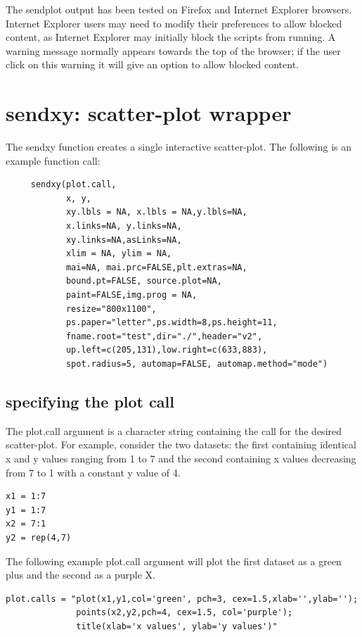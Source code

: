 \documentclass[]{article}
\begin{document}
\vskip5mm
 The sendplot output has been tested on Firefox and Internet Explorer browsers.  Internet Explorer users may need to modify their preferences to allow blocked content, as Internet Explorer may initially block the scripts from running. A warning message normally appears towards the top of the browser; if the user click on this warning it will give an option to allow blocked content.



\section{sendxy: scatter-plot wrapper}

The sendxy function creates a single interactive scatter-plot. The following is an example function call:
\begin{verbatim}
     sendxy(plot.call,
            x, y, 
            xy.lbls = NA, x.lbls = NA,y.lbls=NA,
            x.links=NA, y.links=NA,
            xy.links=NA,asLinks=NA,
            xlim = NA, ylim = NA,
            mai=NA, mai.prc=FALSE,plt.extras=NA,
            bound.pt=FALSE, source.plot=NA,
            paint=FALSE,img.prog = NA,
            resize="800x1100",
            ps.paper="letter",ps.width=8,ps.height=11,
            fname.root="test",dir="./",header="v2",
            up.left=c(205,131),low.right=c(633,883),
            spot.radius=5, automap=FALSE, automap.method="mode")
 \end{verbatim}


\subsection{specifying the plot call}
The plot.call argument is a character string containing the call for the desired scatter-plot. For example, consider the two datasets: the first containing identical x and y values ranging from 1 to 7 and the second containing x values decreasing from 7 to 1 with a constant y value of 4.

\begin{verbatim}
x1 = 1:7
y1 = 1:7  
x2 = 7:1
y2 = rep(4,7)
\end{verbatim}

The following example plot.call argument will plot the first dataset as a green plus and the second as a purple X. 

\begin{verbatim}
plot.calls = "plot(x1,y1,col='green', pch=3, cex=1.5,xlab='',ylab='');
              points(x2,y2,pch=4, cex=1.5, col='purple');
              title(xlab='x values', ylab='y values')"
\end{verbatim}
\end{document}
